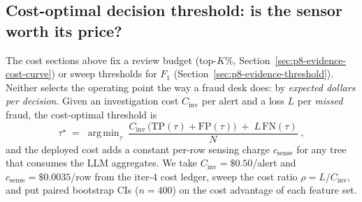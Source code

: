 \documentclass{article}
\providecommand{\secref}[1]{Section~\ref{#1}}
\DeclareMathOperator*{\argmin}{arg\,min}
\begin{document}
 \subsection{Cost-optimal decision threshold: is the sensor worth its price?}
\label{sec:p8-evidence-cost-optimal}

The cost sections above fix a review budget (top-$K\%$,
\secref{sec:p8-evidence-cost-curve}) or sweep thresholds for
$F_1$ (\secref{sec:p8-evidence-threshold}). Neither selects the
operating point the way a fraud desk does: by \emph{expected dollars per
decision}. Given an investigation cost $C_{\text{inv}}$ per alert and a
loss $L$ per \emph{missed} fraud, the cost-optimal threshold is
\begin{equation}
\tau^\star \;=\; \argmin_{\tau}\;
  \frac{C_{\text{inv}}\,\big(\mathrm{TP}(\tau)+\mathrm{FP}(\tau)\big)
        \;+\; L\,\mathrm{FN}(\tau)}{N}\; ,
\label{eq:p8-tau-star}
\end{equation}
and the deployed cost adds a constant per-row sensing charge
$c_{\text{sense}}$ for any tree that consumes the LLM aggregates. We take
$C_{\text{inv}}=\$0.50$/alert and $c_{\text{sense}}=\$0.0035$/row from the
iter-4 cost ledger, sweep the cost ratio $\rho = L/C_{\text{inv}}$, and put
paired bootstrap CIs ($n{=}400$) on the cost advantage of each feature set.
\end{document}
